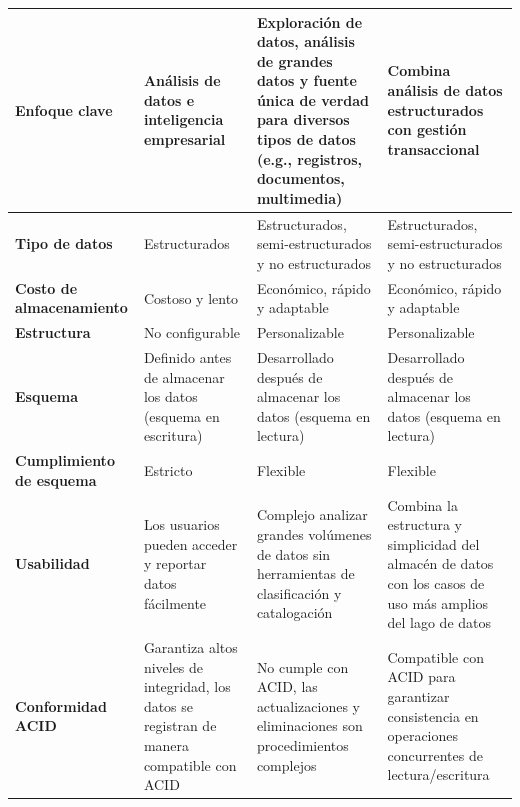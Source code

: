 \begin{longtable}{|p{3cm}|p{4cm}|p{4cm}|p{4cm}|}
    \textbf{Enfoque clave}    & Análisis de datos e inteligencia empresarial                & Exploración de datos, análisis de grandes datos y fuente única de verdad para diversos tipos de datos (e.g., registros, documentos, multimedia) & Combina análisis de datos estructurados con gestión transaccional            \\ \hline
    \textbf{Tipo de datos}    & Estructurados                                               & Estructurados, semi-estructurados y no estructurados                         & Estructurados, semi-estructurados y no estructurados                         \\ \hline
    \textbf{Costo de almacenamiento}            & Costoso y lento                                             & Económico, rápido y adaptable                                                & Económico, rápido y adaptable                                                \\ \hline
    \textbf{Estructura}       & No configurable                                             & Personalizable                                                               & Personalizable                                                               \\ \hline
    \textbf{Esquema}          & Definido antes de almacenar los datos (esquema en escritura) & Desarrollado después de almacenar los datos (esquema en lectura)             & Desarrollado después de almacenar los datos (esquema en lectura)             \\ \hline
    \textbf{Cumplimiento de esquema} & Estricto                                              & Flexible                                                                     & Flexible                                                                     \\ \hline
    \textbf{Usabilidad}       & Los usuarios pueden acceder y reportar datos fácilmente     & Complejo analizar grandes volúmenes de datos sin herramientas de clasificación y catalogación & Combina la estructura y simplicidad del almacén de datos con los casos de uso más amplios del lago de datos \\ \hline
    \textbf{Conformidad ACID} & Garantiza altos niveles de integridad, los datos se registran de manera compatible con ACID & No cumple con ACID, las actualizaciones y eliminaciones son procedimientos complejos & Compatible con ACID para garantizar consistencia en operaciones concurrentes de lectura/escritura \\ \hline

\end{longtable}
